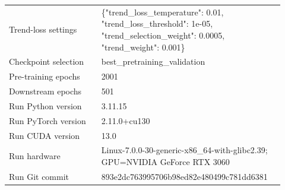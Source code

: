 \begin{table}[p]
\begin{tabular}{p{0.32\linewidth}p{0.60\linewidth}}
Trend-loss settings & \{"trend\_loss\_temperature": 0.01, "trend\_loss\_threshold": 1e-05, "trend\_selection\_weight": 0.0005, "trend\_weight": 0.001\} \\
Checkpoint selection & best\_pretraining\_validation \\
Pre-training epochs & 2001 \\
Downstream epochs & 501 \\
Run Python version & 3.11.15 \\
Run PyTorch version & 2.11.0+cu130 \\
Run CUDA version & 13.0 \\
Run hardware & Linux-7.0.0-30-generic-x86\_64-with-glibc2.39; GPU=NVIDIA GeForce RTX 3060 \\
Run Git commit & 893e2dc763995706b98ed82e480499c781dd6381 \\
\bottomrule
\end{tabular}
\end{table}
